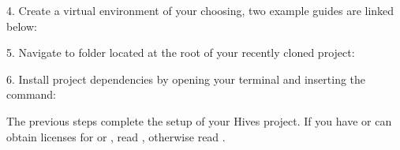 \documentclass[letterpaper,10pt,english]{sphinxmanual}
\begin{document}
\begin{DUlineblock}{0em}
\item[] \sphinxhyphen{} 
\end{DUlineblock}

4. Create a virtual environment of your choosing, two example guides are
linked below:

\begin{DUlineblock}{0em}
\item[] \sphinxhyphen{} 
\item[] \sphinxhyphen{} 
\end{DUlineblock}

5. Navigate to  folder located at the root of your recently cloned
project:

\begin{DUlineblock}{0em}
\item[] \sphinxhyphen{} 
\end{DUlineblock}

6. Install project dependencies by opening your terminal and inserting the
command:

\begin{DUlineblock}{0em}
\item[] \sphinxhyphen{} 
\end{DUlineblock}

The previous steps complete the setup of your Hives project. If you have or
can obtain licenses for  or , read {\hyperref[\detokenize{quickstartdocs:installation-part-ii}]{}},
otherwise read {\hyperref[\detokenize{quickstartdocs:disabling-licensed-components}]{}}.
\end{document}
